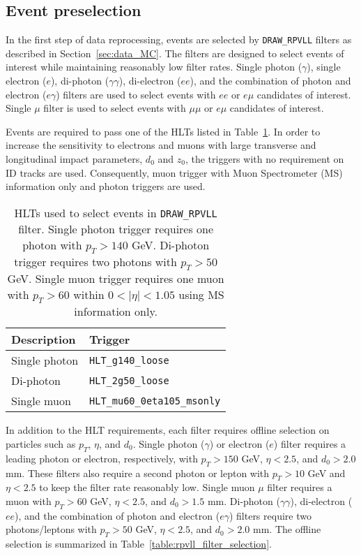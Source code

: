 \subsection{Event preselection}
\label{sec:preselection}
In the first step of data reprocessing, events are selected by \texttt{DRAW\_RPVLL} filters as described in Section~\ref{sec:data_MC}. The filters are designed to select events of interest while maintaining reasonably low filter rates. Single photon ($\gamma$), single electron ($e$), di-photon ($\gamma\gamma$), di-electron ($ee$), and the combination of photon and electron ($e\gamma$) filters are used to select events with $ee$ or $e\mu$ candidates of interest. Single $\mu$ filter is used to select events with $\mu\mu$ or $e\mu$ candidates of interest.

Events are required to pass one of the HLTs listed in Table~\ref{table:triggers}. In order to increase the sensitivity to electrons and muons with large transverse and longitudinal impact parameters, $d_{0}$ and $z_{0}$, the triggers with no requirement on ID tracks are used. Consequently, muon trigger with Muon Spectrometer (MS) information only and photon triggers are used.

\begin{table}[!htb]
  \centering
  \begin{tabular}{l l}
    \hline
    \hline
    Description     			& Trigger	        	                \\
    \hline
	Single photon 	            & \texttt{HLT\_g140\_loose}             \\
	Di-photon	                & \texttt{HLT\_2g50\_loose}             \\
	Single muon                 & \texttt{HLT\_mu60\_0eta105\_msonly}   \\
    \hline
    \hline
  \end{tabular}
  \caption{HLTs used to select events in \texttt{DRAW\_RPVLL} filter. Single photon trigger requires one photon with $p_{T} > 140$ GeV. Di-photon trigger requires two photons with $p_{T} > 50$ GeV. Single muon trigger requires one muon with $p_{T} > 60$ within $0 < |\eta| < 1.05$ using MS information only.}
  \label{table:triggers}
\end{table}

In addition to the HLT requirements, each filter requires offline selection on particles such as $p_{T}$, $\eta$, and $d_{0}$. Single photon ($\gamma$) or electron ($e$) filter requires a leading photon or electron, respectively, with $p_{T} > 150$ GeV, $\eta < 2.5$, and $d_{0} > 2.0$ mm. These filters also require a second photon or lepton with $p_{T} > 10$ GeV and $\eta < 2.5$ to keep the filter rate reasonably low. Single muon $\mu$ filter requires a muon with $p_{T} > 60$ GeV, $\eta < 2.5$, and $d_{0} > 1.5$ mm. Di-photon ($\gamma\gamma$), di-electron ($ee$), and the combination of photon and electron ($e\gamma$) filters require two photons/leptons with $p_{T} > 50$ GeV, $\eta < 2.5$, and $d_{0} > 2.0$ mm. The offline selection is summarized in Table~\ref{table:rpvll_filter_selection}.

